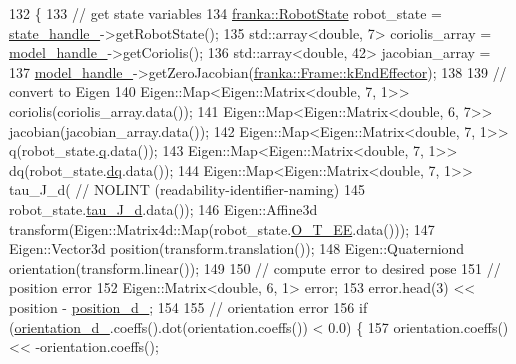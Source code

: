 \begin{DoxyCode}
132                                                                        \{
133   \textcolor{comment}{// get state variables}
134   \hyperlink{structfranka_1_1RobotState}{franka::RobotState} robot\_state = \hyperlink{classfranka__example__controllers_1_1CartesianImpedanceExampleController_affdc57722887831ee0e3e02332eae345}{state\_handle\_}->getRobotState();
135   std::array<double, 7> coriolis\_array = \hyperlink{classfranka__example__controllers_1_1CartesianImpedanceExampleController_a588de895d4aaef43c00bc11e6b789084}{model\_handle\_}->getCoriolis();
136   std::array<double, 42> jacobian\_array =
137       \hyperlink{classfranka__example__controllers_1_1CartesianImpedanceExampleController_a588de895d4aaef43c00bc11e6b789084}{model\_handle\_}->getZeroJacobian(\hyperlink{namespacefranka_a00b729ddce916481d3f0d10febec4f5ba3617dcc7555dbca3c3e86e7535914fdf}{franka::Frame::kEndEffector});
138 
139   \textcolor{comment}{// convert to Eigen}
140   Eigen::Map<Eigen::Matrix<double, 7, 1>> coriolis(coriolis\_array.data());
141   Eigen::Map<Eigen::Matrix<double, 6, 7>> jacobian(jacobian\_array.data());
142   Eigen::Map<Eigen::Matrix<double, 7, 1>> q(robot\_state.\hyperlink{structfranka_1_1RobotState_ade3335d1ac2f6c44741a916d565f7091}{q}.data());
143   Eigen::Map<Eigen::Matrix<double, 7, 1>> dq(robot\_state.\hyperlink{structfranka_1_1RobotState_af372a0081d72bc7b4fe873f99c7b2d8c}{dq}.data());
144   Eigen::Map<Eigen::Matrix<double, 7, 1>> tau\_J\_d(  \textcolor{comment}{// NOLINT (readability-identifier-naming)}
145       robot\_state.\hyperlink{structfranka_1_1RobotState_a7086a89a2705810f93a3a95d43df2d9d}{tau\_J\_d}.data());
146   Eigen::Affine3d transform(Eigen::Matrix4d::Map(robot\_state.\hyperlink{structfranka_1_1RobotState_a193781d47722b32925e0ea7ac415f442}{O\_T\_EE}.data()));
147   Eigen::Vector3d position(transform.translation());
148   Eigen::Quaterniond orientation(transform.linear());
149 
150   \textcolor{comment}{// compute error to desired pose}
151   \textcolor{comment}{// position error}
152   Eigen::Matrix<double, 6, 1> error;
153   error.head(3) << position - \hyperlink{classfranka__example__controllers_1_1CartesianImpedanceExampleController_a7b1ed13a31a9561ced03a8a9221a303f}{position\_d\_};
154 
155   \textcolor{comment}{// orientation error}
156   \textcolor{keywordflow}{if} (\hyperlink{classfranka__example__controllers_1_1CartesianImpedanceExampleController_a8528ed0cf7de6439e65bb1d4c4017137}{orientation\_d\_}.coeffs().dot(orientation.coeffs()) < 0.0) \{
157     orientation.coeffs() << -orientation.coeffs();

\end{DoxyCode}
